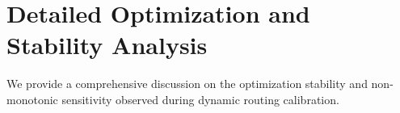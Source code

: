 \documentclass{article}
\theoremstyle{plain}
\theoremstyle{definition}
\theoremstyle{remark}
\begin{document}










\newpage
\appendix
\onecolumn
\section{Detailed Optimization and Stability Analysis}
\label{appendix:stability}

We provide a comprehensive discussion on the optimization stability and non-monotonic sensitivity observed during dynamic routing calibration. 
\end{document}
